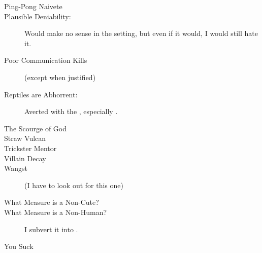 \begin{flushleft}
\begin{description}
  \item[Ping-Pong Naivete]
  \item[Plausible Deniability:] 
    Would make no sense in the setting, but even if it would, I would still hate it.
  \item[Poor Communication Kills] (except when justified)
  \item[Reptiles are Abhorrent:] 
    Averted with the \scathae, especially . 
  \item[The Scourge of God]
  \item[Straw Vulcan]
  \item[Trickster Mentor]
  \item[Villain Decay]
  \item[Wangst] (I have to look out for this one)
  \item[What Measure is a Non-Cute?]
  \item[What Measure is a Non-Human?] 
    I subvert it into . 
  \item[You Suck] 
\end{description}


\end{flushleft}
